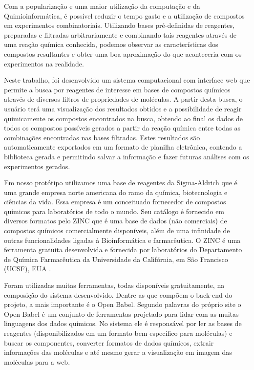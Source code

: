 \documentclass{abnt}
\begin{document}
Com a popularização e uma maior utilização da computação e da Quimioinformática,
é possível reduzir o tempo gasto e a utilização de compostos em experimentos combinatoriais.
Utilizando bases pré-definidas de reagentes, preparadas e filtradas arbitrariamente
e combinando tais reagentes através de uma reação química conhecida, podemos observar
as características dos compostos resultantes e obter uma boa aproximação do que
aconteceria com os experimentos na realidade.

Neste trabalho, foi desenvolvido um sistema computacional com interface web que
permite a busca por reagentes de interesse em bases de compostos químicos através
de diversos filtros de propriedades de moléculas. A partir desta busca, o usuário
terá uma visualização dos resultados obtidos e a possibilidade de reagir quimicamente
os compostos encontrados na busca, obtendo ao final os dados de todos os compostos
possíveis gerados a partir da reação química entre todas as combinações encontradas
nas bases filtradas. Estes resultados são automaticamente exportados em um formato
de planilha eletrônica, contendo a biblioteca gerada e permitindo salvar a informação
e fazer futuras análises com os experimentos gerados.

Em nosso protótipo utilizamos uma base de reagentes da Sigma-Aldrich\cite{SIGMA} que é uma grande
empresa norte americana do ramo da química, biotecnologia e ciências da vida. Essa
empresa é um conceituado fornecedor de compostos químicos para laboratórios de todo
o mundo. Seu catálogo é fornecido em diversos formatos pelo ZINC\cite{ZINC} que é uma base de
dados (não comerciais) de compostos químicos comercialmente disponíveis, além de
uma infinidade de outras funcionalidades ligadas à Bioinformática e farmacêutica.
O ZINC é uma ferramenta gratuita desenvolvida e fornecida por laboratórios do Departamento
de Química Farmacêutica da Universidade da Califórnia, em São Francisco (UCSF),
EUA \cite{UCSFCHEM}.

Foram utilizadas muitas ferramentas, todas disponíveis gratuitamente, na composição
do sistema desenvolvido. Dentre as que compõem o back-end do projeto, a mais importante
é o Open Babel\cite{OPEN_BABEL}. Segundo palavras do próprio site o Open Babel é um conjunto de ferramentas
projetado para lidar com as muitas linguagens dos dados químicos. No sistema ele
é responsável por ler as bases de reagentes (disponibilizados em um formato bem
específico para moléculas) e buscar os componentes, converter formatos de dados
químicos, extrair informações das moléculas e até mesmo gerar a visualização em
imagem das moléculas para a web.
\end{document}
